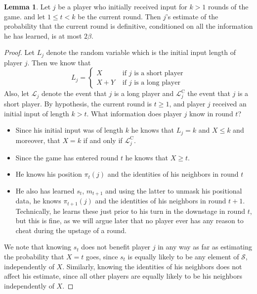 \documentclass[12pt]{article}
\theoremstyle{definition}
\newtheorem{lemma}[theorem]{Lemma}
\renewcommand{\S}{\mathcal{S}}
\begin{document}
\begin{lemma}\label{lem:guess}
Let $j$ be a player who initially received input for $k>1$ rounds of the game.
and let $1 \le t<k$ be the current round. Then $j$'s estimate of the 
probability that the current round is definitive, conditioned on all the 
information he has learned, is at most $2\beta$. 
\end{lemma}
\begin{proof}
\newcommand{\longp}{\mathcal{L}_j}
\newcommand{\shortp}{\mathcal{L}_j^{\mathrm{C}}}
Let $L_j$ denote the random variable which is the initial input length of 
player $j$. Then we know that 
\begin{equation}\label{eq:Lj}
L_j =\begin{cases} X & \mbox{ if $j$ is a short player} \\
X+Y & \mbox{ if $j$ is a long player}\end{cases}
\end{equation}
Also, let $\longp$ denote the event that $j$ is a long player and 
$\shortp$ the event that $j$ is a short player.  By hypothesis, 
the current round is $t \ge 1$, and player $j$ received an initial input of 
length $k>t$. What information does player $j$ know in round $t$?
\begin{itemize}
\item Since his initial input was of length $k$ he knows that $L_j=k$ and  
$X \le k$ and moreover, that $X=k$ if and only if $\shortp$.
\item Since the game has entered round $t$ he knows that $X\ge t$. 
\item He knows his position $\pi_t(j)$ and the identities of his neighbors 
in round $t$
\item He also has learned $s_t$, $m_{t+1}$ and using the latter to unmask his 
positional data, he knows $\pi_{t+1}(j)$ and the identities of his neighbors
in round $t+1$.  Technically, he learns these just prior to his turn in the 
downstage in round $t$, but this is fine, as we will argue later that 
no player ever has any reason to cheat during the upstage of a round.
\end{itemize}

We note that knowing $s_t$ does not benefit player $j$ in any way as far as 
estimating the probability that $X=t$ goes, since $s_t$ is equally likely to 
be any element of $\S$, independently of $X$. Similarly, knowing the 
identities of his neighbors 
does not affect his estimate, since all other players are equally likely to 
be his neighbors independently of $X$. 


\end{proof}
\end{document}
